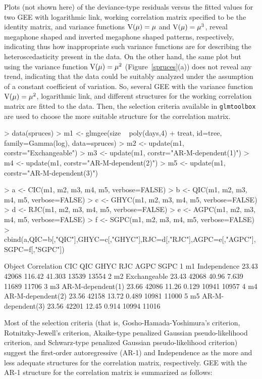 Plots (not shown here) of the deviance-type residuals versus the fitted values for two GEE with logarithmic link, working correlation matrix specified to be the identity matrix, and variance functions ${\rm V}(\mu) = \mu$ and ${\rm V}(\mu) = \mu^3$, reveal megaphone shaped and inverted megaphone shaped patterns, respectively, indicating thus how inappropriate such variance functions are for describing the heteroscedasticity present in the data. On the other hand, the same plot but using the variance function ${\rm V}(\mu) = \mu^2$ (Figure~\ref{spruces}(a)) does not reveal any trend, indicating that the data could be suitably analyzed under the assumption of a constant coefficient of variation. So, several GEE with the variance function ${\rm V}(\mu) = \mu^2$, logarithmic link, and different structures for the working correlation matrix are fitted to the data. Then, the selection criteria available in {\tt glmtoolbox} are used to choose the more suitable structure for the correlation matrix.

\begin{example}
> data(spruces)
> m1 <- glmgee(size ~ poly(days,4) + treat, id=tree, family=Gamma(log), data=spruces)
> m2 <- update(m1, corstr="Exchangeable")
> m3 <- update(m1, corstr="AR-M-dependent(1)")
> m4 <- update(m1, corstr="AR-M-dependent(2)")
> m5 <- update(m1, corstr="AR-M-dependent(3)")

> a <- CIC(m1, m2, m3, m4, m5, verbose=FALSE)
> b <- QIC(m1, m2, m3, m4, m5, verbose=FALSE)
> c <- GHYC(m1, m2, m3, m4, m5, verbose=FALSE)
> d <- RJC(m1, m2, m3, m4, m5, verbose=FALSE)
> e <- AGPC(m1, m2, m3, m4, m5, verbose=FALSE)
> f <- SGPC(m1, m2, m3, m4, m5, verbose=FALSE)
> cbind(a,QIC=b[,"QIC"],GHYC=c[,"GHYC"],RJC=d[,"RJC"],AGPC=e[,"AGPC"],SGPC=f[,"SGPC"])

  Object       Correlation   CIC   QIC   GHYC    RJC  AGPC  SGPC
1     m1      Independence 23.43 42068 116.42 41.303 13539 13554
2     m2      Exchangeable 23.43 42068  40.96  7.639 11689 11706
3     m3 AR-M-dependent(1) 23.66 42086  11.26  0.129 10941 10957
4     m4 AR-M-dependent(2) 23.56 42158  13.72  0.489 10981 11000
5     m5 AR-M-dependent(3) 23.56 42201  12.45  0.914 10994 11016
\end{example}

Most of the selection criteria (that is, Gosho-Hamada-Yoshimura’s criterion, Rotnitzky-Jewell’s criterion, Akaike-type penalized Gaussian pseudo-likelihood criterion, and Schwarz-type penalized Gaussian pseudo-likelihood criterion) suggest the first-order autoregressive (AR-1) and Independence as the more and less adequate structures for the correlation matrix, respectively. GEE with the AR-1 structure for the correlation matrix is summarized as follows:

